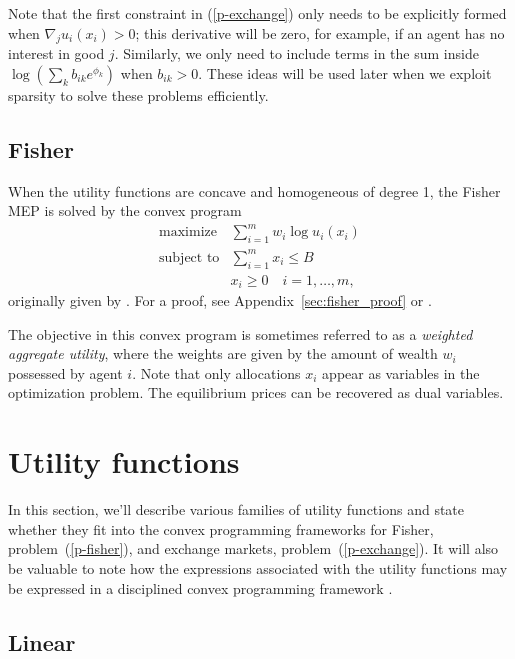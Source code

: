\documentclass[12pt]{article}
\begin{document}
Note that the first constraint in (\ref{p-exchange}) only needs to be explicitly formed when
$\nabla_j u_i(x_i) > 0$; this derivative will be zero, for example, if an agent has no interest in good $j$. Similarly, we only need to include terms in the sum inside
$\log(\sum_k b_{ik} e^{\phi_k})$ when $b_{ik} > 0$.
These ideas will be used later when we exploit sparsity to solve these
problems efficiently.

\subsection{Fisher}
\label{sec:convex_form_fisher}

When the utility functions are concave and homogeneous of degree 1,
the Fisher MEP is solved by the convex program
\begin{equation}
\label{p-fisher}
\begin{array}{ll}
\mbox{maximize} & \sum_{i=1}^m w_i \log u_i(x_i) \\
\mbox{subject to} & \sum_{i=1}^m x_i \leq B\\
& x_i \geq 0\quad i=1,\ldots,m,
\end{array}
\end{equation}
originally given by \cite{eisenberg1959consensus, gale1960theory, eisenberg1961aggregation}.
For a proof, see Appendix~\ref{sec:fisher_proof} or \cite[\S~6.2]{nisan2007algorithmic}.

The objective in this convex program is sometimes referred to as a \emph{weighted aggregate utility}, where the weights are given by the amount
of wealth $w_i$ possessed by agent $i$.
Note that only allocations $x_i$ appear as variables in the optimization
problem.
The equilibrium prices can be recovered as dual variables.

\section{Utility functions}
\label{sec:util_funcs}

In this section, we'll describe various families of utility functions
and state whether they fit into the convex programming frameworks
for Fisher, problem~(\ref{p-fisher}), and exchange markets, problem~(\ref{p-exchange}). 
It will also
be valuable to note how the expressions associated
with the utility functions may be expressed in a disciplined
convex programming framework \cite{GBY:06,Grant2004,cvx,cvxpy}.


\subsection{Linear}
\end{document}
